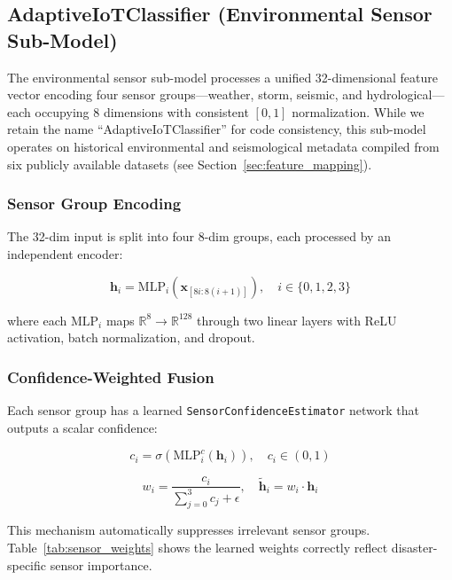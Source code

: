 \documentclass[journal]{IEEEtran}
\begin{document}
\subsection{AdaptiveIoTClassifier (Environmental Sensor Sub-Model)}

The environmental sensor sub-model processes a unified 32-dimensional feature vector encoding four sensor groups---weather, storm, seismic, and hydrological---each occupying 8 dimensions with consistent $[0, 1]$ normalization. While we retain the name ``AdaptiveIoTClassifier'' for code consistency, this sub-model operates on historical environmental and seismological metadata compiled from six publicly available datasets (see Section~\ref{sec:feature_mapping}).

\subsubsection{Sensor Group Encoding}

The 32-dim input is split into four 8-dim groups, each processed by an independent encoder:

\begin{equation}
\mathbf{h}_i = \text{MLP}_i(\mathbf{x}_{[8i:8(i+1)]}), \quad i \in \{0,1,2,3\}
\end{equation}

where each $\text{MLP}_i$ maps $\mathbb{R}^8 \to \mathbb{R}^{128}$ through two linear layers with ReLU activation, batch normalization, and dropout.

\subsubsection{Confidence-Weighted Fusion}

Each sensor group has a learned \texttt{SensorConfidenceEstimator} network that outputs a scalar confidence:

\begin{equation}
c_i = \sigma(\text{MLP}^c_i(\mathbf{h}_i)), \quad c_i \in (0, 1)
\end{equation}

\begin{equation}
w_i = \frac{c_i}{\sum_{j=0}^{3} c_j + \epsilon}, \quad \tilde{\mathbf{h}}_i = w_i \cdot \mathbf{h}_i
\end{equation}

This mechanism automatically suppresses irrelevant sensor groups. Table~\ref{tab:sensor_weights} shows the learned weights correctly reflect disaster-specific sensor importance.
\end{document}
